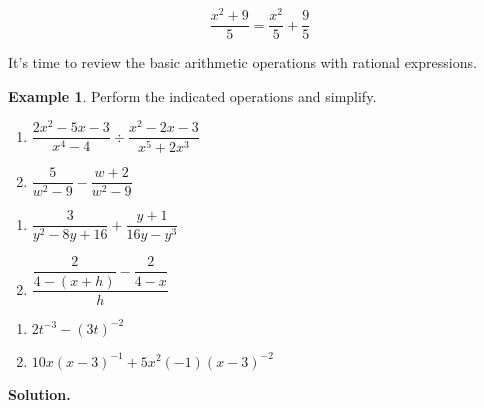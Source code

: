 \documentclass[11pt]{article}
\theoremstyle{definition}  %
\newtheorem{ex}{\bf Example}
\newcounter{HW}
\begin{document}
\[ \dfrac{x^2+9}{5} = \dfrac{x^2}{5} + \dfrac{9}{5} \] 

It's time to review the basic arithmetic operations with rational expressions. 

\pagebreak

\begin{ex} \label{rationalexpressionreviewex} Perform the indicated operations and simplify.

\begin{multicols}{2}
\begin{enumerate}

\item  $\dfrac{2x^2-5x-3}{x^4 - 4} \div \dfrac{x^2-2x-3}{x^5 + 2x^3}$

\item  $\dfrac{5}{w^2 - 9} - \dfrac{w+2}{w^2-9}$

\setcounter{HW}{\value{enumi}}
\end{enumerate}

\end{multicols}

\begin{multicols}{2}
\begin{enumerate}
\setcounter{enumi}{\value{HW}}

\item  $\dfrac{3}{y^2 - 8y + 16} + \dfrac{y+1}{16y - y^3}$

\item  $\dfrac{\dfrac{2}{4 - (x+h)} - \dfrac{2}{4-x}}{h}$

\setcounter{HW}{\value{enumi}}
\end{enumerate}

\end{multicols}

\begin{multicols}{2}
\begin{enumerate}
\setcounter{enumi}{\value{HW}}

\item  $2t^{-3} - (3t)^{-2}$

\item  $10x(x-3)^{-1} + 5x^2(-1)(x-3)^{-2}$

\setcounter{HW}{\value{enumi}}
\end{enumerate}

\end{multicols}

{\bf Solution.}


\end{ex}
\end{document}
